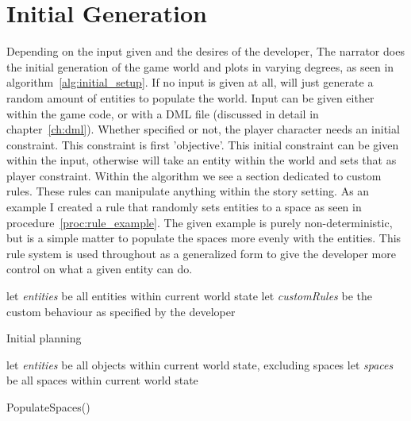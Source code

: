 \section{Initial Generation}
Depending on the input given and the desires of the developer, The narrator does the initial generation of the game world and plots in varying degrees, as seen in algorithm~\ref{alg:initial_setup}.
If no input is given at all, \diage will just generate a random amount of entities to populate the world.
Input can be given either within the game code, or with a DML file (discussed in detail in chapter~\ref{ch:dml}).
Whether specified or not, the player character needs an initial constraint.
This constraint is \his first 'objective'.
This initial constraint can be given within the input, otherwise \diage will take an entity within the world and sets that as player constraint.
Within the algorithm we see a section dedicated to custom rules.
These rules can manipulate anything within the story setting.
As an example I created a rule that randomly sets entities to a space as seen in procedure~\ref{proc:rule_example}.
The given example is purely non-deterministic, but is a simple matter to populate the spaces more evenly with the entities.
This rule system is used throughout \diage as a generalized form to give the developer more control on what a given entity can do.
\begin{algorithm}
	let \textit{entities} be all entities within current world state\;
	let \textit{customRules} be the custom behaviour as specified by the developer\;
    \caption{Initial planning}\label{alg:initial_setup}
\end{algorithm}
\begin{procedure}
	let \textit{entities} be all objects within current world state, excluding spaces\;
	let \textit{spaces} be all spaces within current world state\;
	\caption{PopulateSpaces()}\label{proc:rule_example}
\end{procedure}
